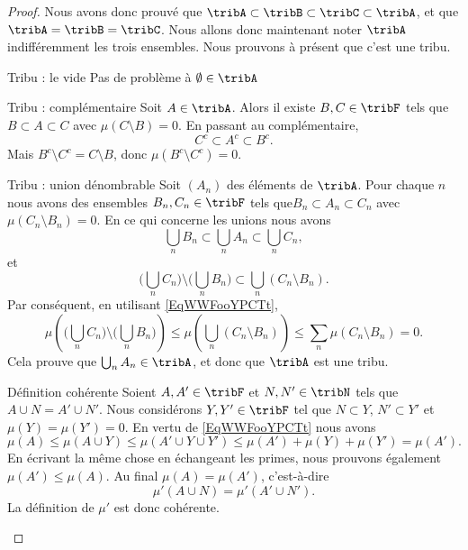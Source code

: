 \begin{proof}
    Nous avons donc prouvé que \( \tribA\subset\tribB\subset\tribC\subset \tribA\), et que \( \tribA=\tribB=\tribC\). Nous allons donc maintenant noter \( \tribA\) indifféremment les trois ensembles. Nous prouvons à présent que c'est une tribu.

    \begin{subproof}
        \item[Tribu : le vide]
            Pas de problème à \( \emptyset\in\tribA\)

        \item[Tribu : complémentaire]
            Soit \( A\in\tribA\). Alors il existe \( B,C\in\tribF\) tels que \( B\subset A\subset C\) avec \( \mu(C\setminus B)=0\). En passant au complémentaire,
            \begin{equation}
                C^c\subset A^c\subset B^c.
            \end{equation}
            Mais \( B^c\setminus C^c=C\setminus B\), donc \( \mu(B^c\setminus C^c)=0\).

        \item[Tribu : union dénombrable]
            Soit \( (A_n)\) des éléments de \( \tribA\). Pour chaque \( n\) nous avons des ensembles \( B_n,C_n\in\tribF\) tels que\( B_n\subset A_n\subset C_n\) avec \( \mu(C_n\setminus B_n)=0\). En ce qui concerne les unions nous avons
            \begin{equation}
                \bigcup_nB_n\subset \bigcup_nA_n\subset \bigcup_nC_n,
            \end{equation}
            et
            \begin{equation}
                \big( \bigcup_nC_n\big)\setminus\big( \bigcup_nB_n\big)\subset \bigcup_n(C_n\setminus B_n).
            \end{equation}
            Par conséquent, en utilisant \eqref{EqWWFooYPCTt},
            \begin{equation}
                \mu\left( \big( \bigcup_nC_n\big)\setminus\big( \bigcup_nB_n\big)\right)\leq\mu\left(  \bigcup_n(C_n\setminus B_n)\right)\leq\sum_n\mu(C_n\setminus B_n)=0.
            \end{equation}
            Cela prouve que \( \bigcup_nA_n\in\tribA\), et donc que \( \tribA\) est une tribu.

        \item[Définition cohérente]
            Soient \( A,A'\in\tribF\) et \( N,N'\in\tribN\) tels que \( A\cup N=A'\cup N'\). Nous considérons \( Y,Y'\in\tribF\) tel que \( N\subset Y\), \( N'\subset Y'\) et \( \mu(Y)=\mu(Y')=0\). En vertu de \eqref{EqWWFooYPCTt} nous avons
            \begin{equation}
                \mu(A)\leq \mu(A\cup Y)\leq \mu(A'\cup Y\cup Y')\leq\mu(A')+\mu(Y)+\mu(Y')=\mu(A').
            \end{equation}
            En écrivant la même chose en échangeant les primes, nous prouvons également \( \mu(A')\leq \mu(A)\). Au final \( \mu(A)=\mu(A')\), c'est-à-dire
            \begin{equation}
                \mu'(A\cup N)=\mu'(A'\cup N').
            \end{equation}
            La définition de \( \mu'\) est donc cohérente.


\end{subproof}
\end{proof}
